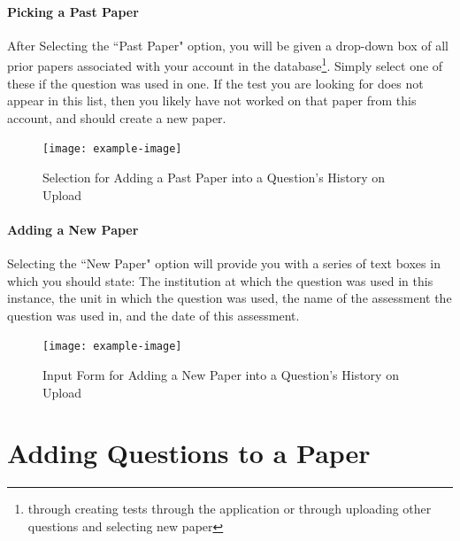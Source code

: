 \documentclass[12pt, a4paper, titlepage]{book}
\begin{document}
\subsubsection{Picking a Past Paper}
After Selecting the ``Past Paper" option, you will be given a drop-down box of all prior papers associated with your account in the database\footnote{through creating tests through the application or through uploading other questions and selecting new paper}. Simply select one of these if the question was used in one. If the test you are looking for does not appear in this list, then you likely have not worked on that paper from this account, and should create a new paper.
\begin{figure}[H]
\centering
\texttt{[image: example-image]}
\caption{Selection for Adding a Past Paper into a Question's History on Upload}
\end{figure}

\subsubsection{Adding a New Paper}
Selecting the ``New Paper" option will provide you with a series of text boxes in which you should state: The institution at which the question was used in this instance, the unit in which the question was used, the name of the assessment the question was used in, and the date of this assessment.
\begin{figure}[htp]
\centering
\texttt{[image: example-image]}
\caption{Input Form for Adding a New Paper into a Question's History on Upload}
\end{figure}

\chapter{Adding Questions to a Paper} \label{ch:qadd}
\end{document}
